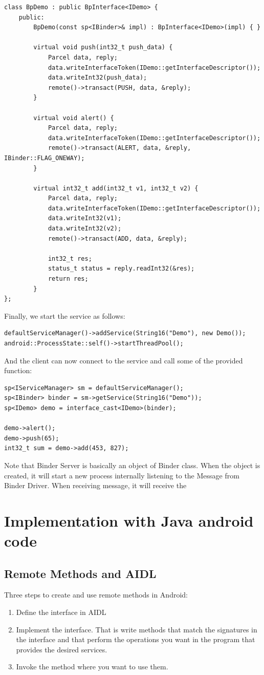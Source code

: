 \documentclass[11pt, a4paper]{book}
\begin{document}
\begin{verbatim}
class BpDemo : public BpInterface<IDemo> {
    public:
        BpDemo(const sp<IBinder>& impl) : BpInterface<IDemo>(impl) { }

        virtual void push(int32_t push_data) {
            Parcel data, reply;
            data.writeInterfaceToken(IDemo::getInterfaceDescriptor());
            data.writeInt32(push_data);
            remote()->transact(PUSH, data, &reply);
        }

        virtual void alert() {
            Parcel data, reply;
            data.writeInterfaceToken(IDemo::getInterfaceDescriptor());
            remote()->transact(ALERT, data, &reply, IBinder::FLAG_ONEWAY);
        }

        virtual int32_t add(int32_t v1, int32_t v2) {
            Parcel data, reply;
            data.writeInterfaceToken(IDemo::getInterfaceDescriptor());
            data.writeInt32(v1);
            data.writeInt32(v2);
            remote()->transact(ADD, data, &reply);

            int32_t res;
            status_t status = reply.readInt32(&res);
            return res;
        }
};
\end{verbatim}
Finally, we start the service as follows:
\begin{verbatim}
defaultServiceManager()->addService(String16("Demo"), new Demo());
android::ProcessState::self()->startThreadPool();
\end{verbatim}

And the client can now connect to the service and call some of the provided
function:
\begin{verbatim}
sp<IServiceManager> sm = defaultServiceManager();
sp<IBinder> binder = sm->getService(String16("Demo"));
sp<IDemo> demo = interface_cast<IDemo>(binder);
 
demo->alert();
demo->push(65);
int32_t sum = demo->add(453, 827);
\end{verbatim}
Note that Binder Server is basically an object of Binder class. When the object
is created, it will start a new process internally listening to the Message from
Binder Driver. When receiving message, it will receive the 
\section{Implementation with Java android code}
\subsection{Remote Methods and AIDL}
Three steps to create and use remote methods in Android:
\begin{enumerate}
    \item Define the interface in AIDL
    \item Implement the interface. That is write methods that match the
        signatures in the interface and that perform the operations you want in
        the program that provides the desired services.
    \item Invoke the method where you want to use them.
\end{enumerate}
\end{document}

